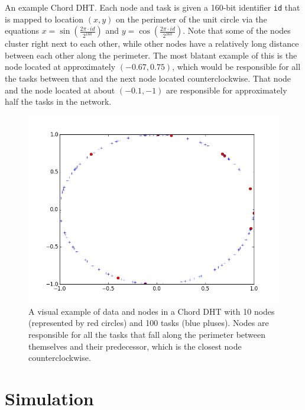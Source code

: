 An example Chord DHT.
Each node and task is given a 160-bit identifier \texttt{id} that is mapped to location $ (x,y) $ on the perimeter of the unit circle via the equations $ x = \sin\left( \frac{ 2 \pi \cdot id}{2^{160}} \right)$ and $ y = \cos\left( \frac{ 2 \pi \cdot id}{2^{160}} \right)$. 
Note that some of the nodes cluster right next to each other, while other nodes have a relatively long distance between each other along the perimeter.  
The most blatant example of this is the node located at approximately $(-0.67, 0.75)$, which would be responsible for all the tasks between that and the next node located counterclockwise.
That node and the node located at about $(-0.1, -1)$ are responsible for approximately half the tasks in the network.

\begin{figure}
\centering
\includegraphics[width=0.7\linewidth]{figs/exampleChordDistribution}
\caption[Distribution of Nodes and Tasks in a Chiord DHT]{A visual example of data and nodes in a Chord DHT with 10 nodes (represented by red circles) and 100 tasks (blue pluses). Nodes are responsible for all the tasks that fall along the perimeter between themselves and their predecessor, which is the closest node counterclockwise.}
\label{fig:exampleChordDistribution}
\end{figure}



\section{Simulation}
\label{sec:auto-simulation}




